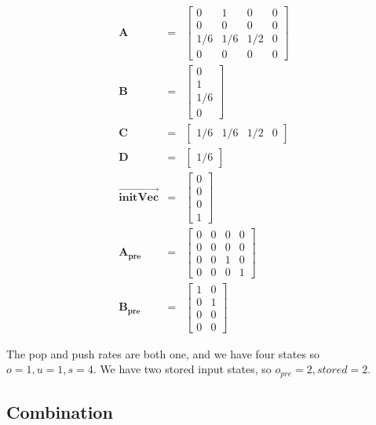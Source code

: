 \begin{eqnarray*}
\mathbf{A} & = & \left [ \begin{array} {cccc} 0 & 1 & 0 & 0 \\ 0 &
0 & 0 & 0 \\ 1/6 & 1/6 & 1/2 & 0 \\ 0 & 0 & 0 & 0 \end{array}
\right ] \\
\mathbf{B} & = & \left [ \begin{array} {c} 0 \\ 1 \\ 1/6 \\ 0
\end{array} \right ] \\
\mathbf{C} & = & \left [ \begin{array} {cccc} 1/6 & 1/6 & 1/2 & 0
\end{array} \right ] \\
\mathbf{D} & = & \left [ \begin{array} {c} 1/6 \end{array} \right
] \\
\overrightarrow{\mathbf{initVec}} & = & \left [ \begin{array} {c}
0 \\ 0 \\ 0 \\ 1 \end{array} \right ] \\
\mathbf{A_{pre}} & = & \left [ \begin{array} {cccc} 0 & 0 & 0 & 0 \\
0 & 0 & 0 & 0 \\ 0 & 0 & 1 & 0 \\ 0 & 0 & 0 & 1 \end{array}
\right ] \\
\mathbf{B_{pre}} & = & \left [ \begin{array} {cc} 1 & 0 \\ 0 & 1
\\ 0 & 0 \\ 0 & 0 \end{array} \right ]
\end{eqnarray*}

    The pop and push rates are both one, and we have four states so $o
= 1, u = 1, s = 4$. We have two stored input states, so $o_{pre} =
2, stored = 2$.

\subsection{Combination}

